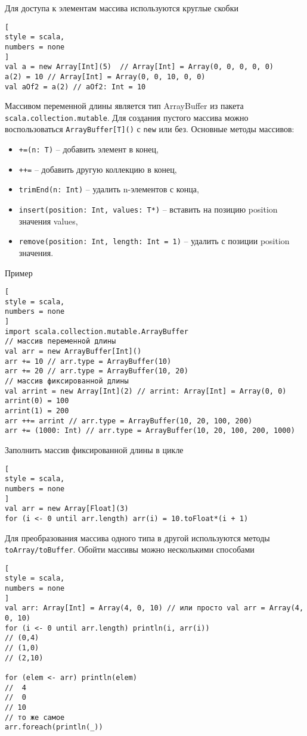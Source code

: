 \documentclass[%
	11pt,
	a4paper,
	utf8,
		]{article}
\begin{document}
Для доступа к элементам массива используются круглые скобки
\begin{lstlisting}[
style = scala,
numbers = none
]
val a = new Array[Int](5)  // Array[Int] = Array(0, 0, 0, 0, 0)
a(2) = 10 // Array[Int] = Array(0, 0, 10, 0, 0)
val aOf2 = a(2) // aOf2: Int = 10
\end{lstlisting}

Массивом переменной длины является тип ArrayBuffer из пакета \texttt{scala.collection.mutable}. Для создания пустого массива можно воспользоваться \texttt{ArrayBuffer[T]()} с \texttt{new} или без. Основные методы массивов:
\begin{itemize}
	\item \texttt{+=(n: T)} -- добавить элемент в конец,
	
	\item \texttt{++=} -- добавить другую коллекцию в конец,
	
	\item \texttt{trimEnd(n: Int)} -- удалить n-элементов с конца,
	
	\item \texttt{insert(position: Int, values: T*)} -- вставить на позицию position значения values,
	
	\item \texttt{remove(position: Int, length: Int = 1)} -- удалить с позиции position значения.
\end{itemize}

Пример
\begin{lstlisting}[
style = scala,
numbers = none
]
import scala.collection.mutable.ArrayBuffer
// массив переменной длины
val arr = new ArrayBuffer[Int]()
arr += 10 // arr.type = ArrayBuffer(10)
arr += 20 // arr.type = ArrayBuffer(10, 20)
// массив фиксированной длины
val arrint = new Array[Int](2) // arrint: Array[Int] = Array(0, 0)
arrint(0) = 100
arrint(1) = 200
arr ++= arrint // arr.type = ArrayBuffer(10, 20, 100, 200)
arr += (1000: Int) // arr.type = ArrayBuffer(10, 20, 100, 200, 1000)
\end{lstlisting}

Заполнить массив фиксированной длины в цикле
\begin{lstlisting}[
style = scala,
numbers = none
]
val arr = new Array[Float](3)
for (i <- 0 until arr.length) arr(i) = 10.toFloat*(i + 1)
\end{lstlisting}

Для преобразования массива одного типа в другой используются методы \texttt{toArray/toBuffer}. Обойти массивы можно несколькими способами
\begin{lstlisting}[
style = scala,
numbers = none
]
val arr: Array[Int] = Array(4, 0, 10) // или просто val arr = Array(4, 0, 10)
for (i <- 0 until arr.length) println(i, arr(i))
// (0,4)
// (1,0)
// (2,10)

for (elem <- arr) println(elem)
//  4
//  0
// 10
// то же самое
arr.foreach(println(_))
\end{lstlisting}
\end{document}
